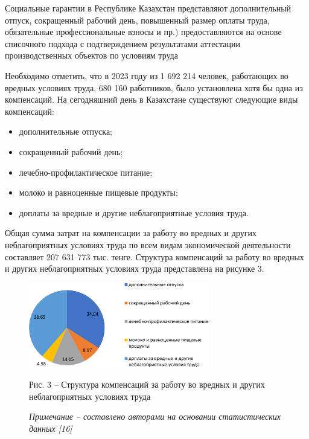 \begin{multicols}{2}
Социальные гарантии в Республике Казахстан представляют дополнительный
отпуск, сокращенный рабочий день, повышенный размер оплаты труда,
обязательные профессиональные взносы и пр.) предоставляются на основе
списочного подхода с подтверждением результатами аттестации
производственных объектов по условиям труда

Необходимо отметить, что в 2023 году из 1 692 214 человек, работающих во
вредных условиях труда, 680 160 работников, было установлена хотя бы
одна из компенсаций. На сегодняшний день в Казахстане существуют
следующие виды компенсаций:

\begin{itemize}
\item
  дополнительные отпуска;
\item
  сокращенный рабочий день;
\item
  лечебно-профилактическое питание;
\item
  молоко и равноценные пищевые продукты;
\item
  доплаты за вредные и другие неблагоприятные условия труда.
\end{itemize}

Общая сумма затрат на компенсации за работу во вредных и других
неблагоприятных условиях труда по всем видам экономической деятельности
составляет 207 631 773 тыс. тенге. Структура компенсаций за работу во
вредных и других неблагоприятных условиях труда представлена на рисунке
3.
\end{multicols}

\begin{figure}[H]
	\centering
	\includegraphics[width=0.7\textwidth]{assets/342.2}
	\caption*{Рис. 3 -- Структура компенсаций за работу во вредных и других неблагоприятных условиях труда}
	\caption*{\normalfont \emph{Примечание -- составлено авторами на основании статистических данных {[}16{]}}}
\end{figure}

